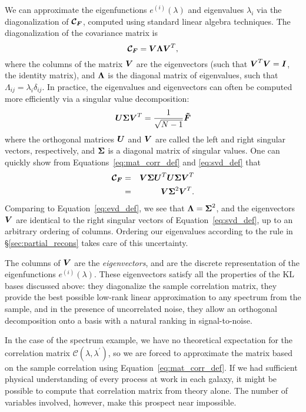 We can approximate the eigenfunctions $e^{(i)}(\lambda)$ and
eigenvalues $\lambda_i$ via the diagonalization 
of $\boldsymbol{\mathcal{C}_F}$, computed using standard linear algebra techniques.
The diagonalization of the covariance matrix is
\begin{equation}
  \label{eq:evd_def}
  \boldsymbol{\mathcal{C}_F} = \boldsymbol{V}\boldsymbol{\Lambda}\boldsymbol{V}^T,
\end{equation}
where the columns of the matrix $\boldsymbol{V}$ are the eigenvectors
(such that $\boldsymbol{V}^T \boldsymbol{V} = \boldsymbol{I}$, the identity matrix), and
$\boldsymbol{\Lambda}$ is the diagonal matrix of eigenvalues, such that
$\Lambda_{ij} = \lambda_i\delta_{ij}$.  In practice, the eigenvalues and
eigenvectors can often be computed more efficiently via a singular value
decomposition:
\begin{equation}
  \label{eq:svd_def}
  \boldsymbol{U}\boldsymbol{\Sigma}\boldsymbol{V}^T
  = \frac{1}{\sqrt{N - 1}}\boldsymbol{\tilde{F}}
\end{equation}
where the orthogonal matrices $\boldsymbol{U}$ and $\boldsymbol{V}$ are called the
left and
right singular vectors, respectively, and $\boldsymbol{\Sigma}$ is a diagonal matrix
of singular values.  One can quickly show from Equations~\ref{eq:mat_corr_def}
and \ref{eq:svd_def} that
\begin{eqnarray}
  \boldsymbol{\mathcal{C}_F}
  &=& \boldsymbol{V}\boldsymbol{\Sigma}\boldsymbol{U}^T
  \boldsymbol{U}\boldsymbol{\Sigma}\boldsymbol{V}^T\nonumber\\
  &=& \boldsymbol{V}\boldsymbol{\Sigma}^2\boldsymbol{V}^T.
\end{eqnarray}
Comparing to Equation~\ref{eq:evd_def}, we see that 
$\boldsymbol{\Lambda} = \boldsymbol{\Sigma}^2$, and the eigenvectors $\boldsymbol{V}$ are
identical to the right singular vectors of Equation~\ref{eq:svd_def},
up to an arbitrary ordering of columns.  Ordering our eigenvalues
according to the rule in \S\ref{sec:partial_recons} takes care of
this uncertainty.

The columns of $\boldsymbol{V}$ are the {\it eigenvectors}, and are the discrete
representation of the eigenfunctions $e^{(i)}(\lambda)$.  These eigenvectors
satisfy all the properties of the KL bases discussed above: they diagonalize
the sample correlation matrix, they provide the best possible low-rank
linear approximation to any spectrum from the sample, and in the presence of
uncorrelated noise, they allow an orthogonal decomposition onto a basis
with a natural ranking in signal-to-noise.

In the case of the spectrum example, we have no theoretical expectation for the
correlation matrix $\mathcal{C}(\lambda, \lambda^\prime)$, so we are forced
to approximate the matrix based on the sample correlation using
Equation~\ref{eq:mat_corr_def}.  If we had sufficient physical understanding
of every process at work in each galaxy, it might be possible to compute
that correlation matrix from theory alone.  The number of variables involved,
however, make this prospect near impossible.

